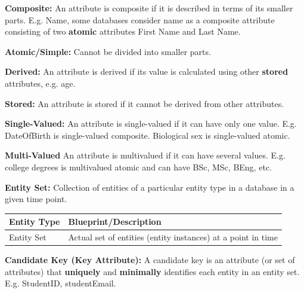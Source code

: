 \documentclass{article}
\begin{document}
\textbf{Composite: }An attribute is composite if it is described in terms of its smaller parts. E.g. Name, some databases consider name as a composite attribute consisting of two \textbf{atomic} attributes First Name and Last Name. 

\textbf{Atomic/Simple: }Cannot be divided into smaller parts.


\textbf{Derived: }An attribute is derived if its value is calculated using other \textbf{stored} attributes, e.g. age.

\textbf{Stored: }An attribute is stored if it cannot be derived from other attributes.


\textbf{Single-Valued: }An attribute is single-valued if it can have only one value. E.g. DateOfBirth is single-valued composite. Biological sex is single-valued atomic.

\textbf{Multi-Valued }An attribute is multivalued if it can have several values. E.g. college degrees is multivalued atomic and can have BSc, MSc, BEng, etc.


\textbf{Entity Set: }Collection of entities of a particular entity type in a database in a given time point.

\begin{tabular}{|l|l|} \hline
    Entity Type & Blueprint/Description \\ \hline
    Entity Set & Actual set of entities (entity instances) at a point in time \\ \hline
\end{tabular}

\textbf{Candidate Key (Key Attribute): }A candidate key is an attribute (or set of attributes) that \textbf{uniquely} and \textbf{minimally} identifies each entity in an entity set. E.g. StudentID, studentEmail.
\end{document}
